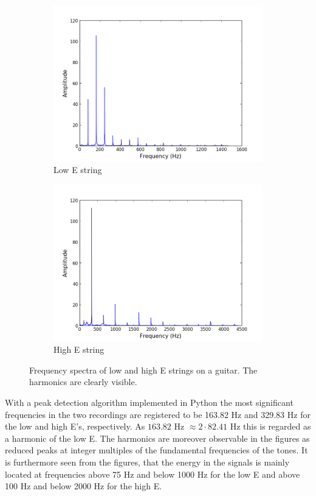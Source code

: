 \begin{figure}[H]
\centering
\begin{subfigure}{0.49\textwidth}
\centering
\includegraphics[width=\textwidth]{figures/freqanal/single_low.png}
\caption{Low E string}
\label{fig:single_low}
\end{subfigure}
\begin{subfigure}{0.49\textwidth}
\centering
\includegraphics[width=\textwidth]{figures/freqanal/single_high.png}
\caption{High E string}
\label{fig:single_high}
\end{subfigure}
\caption{Frequency spectra of low and high E strings on a guitar. The harmonics are clearly visible.}
\label{fig:single}
\end{figure}
With a peak detection algorithm implemented in Python the most significant frequencies in the two recordings are registered to be 163.82 Hz and 329.83 Hz for the low and high E's, respectively. As $163.82$ Hz $\approx 2\cdot82.41$ Hz this is regarded as a harmonic of the low E. The harmonics are moreover observable in the figures as reduced peaks at integer multiples of the fundamental frequencies of the tones. It is furthermore seen from the figures, that the energy in the signals is mainly located at frequencies above 75 Hz and below 1000 Hz for the low E and above 100 Hz and below 2000 Hz for the high E.\\ 

